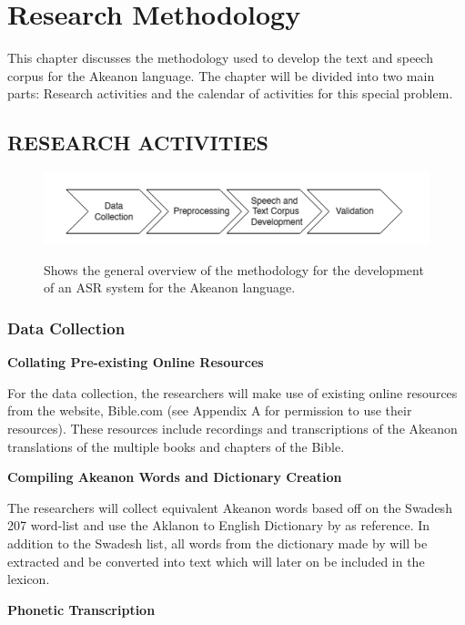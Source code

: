 \chapter{Research Methodology}
This chapter discusses the methodology used to develop the text and speech corpus for the Akeanon language. The chapter will be divided into two main parts: Research activities and the calendar of activities for this special problem.

\section{RESEARCH ACTIVITIES}

\begin{figure}[h!]
	\centering
	\caption{Shows the general overview of the methodology for the development of an ASR system for the Akeanon language.}
	\includegraphics[width=\textwidth]{flowchart.png}
	\label{fig:flowchart}
\end{figure}

\subsection{Data Collection}

\textbf{Collating Pre-existing Online Resources}

For the data collection, the researchers will make use of existing online resources from the website, Bible.com (see Appendix A for permission to use their resources). These resources include recordings and transcriptions of the Akeanon translations of the multiple books and chapters of the Bible.

\textbf{Compiling Akeanon Words and Dictionary Creation}

The researchers will collect equivalent Akeanon words based off on the Swadesh 207 word-list and use the Aklanon to English Dictionary by  as reference. In addition to the Swadesh list, all words from the dictionary made by  will be extracted and be converted into text which will later on be included in the lexicon.

\textbf{Phonetic Transcription}


